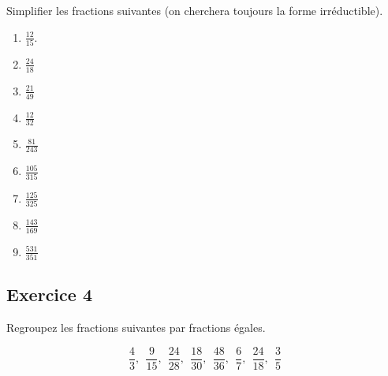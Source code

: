 \documentclass[14 pt]{extarticle}
\theoremstyle{plain}
\begin{document}
Simplifier les fractions suivantes (on cherchera toujours la forme
irréductible). 
\begin{enumerate}
\item $\frac{12}{15}$. 
\item $\frac{24}{18}$
\item $\frac{21}{49}$ 
\item $\frac{12}{32}$
\item $\frac{81}{243}$
\item $\frac{105}{315}$
\item $\frac{125}{325}$
\item $\frac{143}{169}$
\item $\frac{531}{351}$
\end{enumerate}


\subsection*{Exercice 4}

Regroupez les fractions suivantes par fractions égales. 

\[ \frac43, \ \  
 \frac{9}{15}, \ \    
 \frac{24}{28}, \ \  
 \frac{18}{30}, \ \  
  \frac{48}{36}, \ \  
   \frac67, \ \  
      \frac{24}{18}, \ \  
       \frac{3}{5}\]


 	
\end{document}
